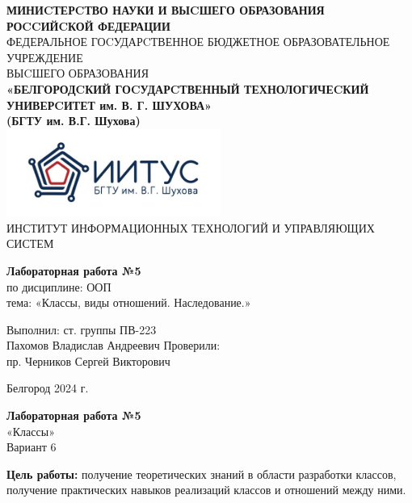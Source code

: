 \documentclass[a4paper,14pt]{extarticle}
\newcommand\textbox[1]{
	\parbox{.45\textwidth}{#1}
}
\begin{document}
\begin{center}
    \small{
        \textbf{МИНИCТЕРCТВО НАУКИ И ВЫCШЕГО ОБРАЗОВАНИЯ РОCCИЙCКОЙ ФЕДЕРАЦИИ}\\
        ФЕДЕРАЛЬНОЕ ГОCУДАРCТВЕННОЕ БЮДЖЕТНОЕ ОБРАЗОВАТЕЛЬНОЕ УЧРЕЖДЕНИЕ\\ВЫCШЕГО ОБРАЗОВАНИЯ \\
        \textbf{«БЕЛГОРОДCКИЙ ГОCУДАРCТВЕННЫЙ ТЕХНОЛОГИЧЕCКИЙ\\УНИВЕРCИТЕТ им. В. Г. ШУХОВА»\\ (БГТУ им. В.Г. Шухова)} \\
        \bigbreak
        \includegraphics[width=70mm]{log}\\
        ИНСТИТУТ ИНФОРМАЦИОННЫХ ТЕХНОЛОГИЙ И УПРАВЛЯЮЩИХ СИСТЕМ\\}
\end{center}

\vfill
\begin{center}
    \large{
        \textbf{
            Лабораторная работа №5}}\\
    \normalsize{
        по дисциплине: ООП \\
        тема: «Классы, виды отношений. Наследование.»}
\end{center}
\vfill
\hfill\textbox{
    Выполнил: ст. группы ПВ-223\\Пахомов Владислав Андреевич
    \bigbreak
    Проверили: \\пр. Черников Сергей Викторович
}
\vfill\begin{center}
    Белгород 2024 г.
\end{center}
\newpage
\begin{center}
    \textbf{Лабораторная работа №5}\\
    «Классы»\\
    Вариант 6
\end{center}
\textbf{Цель работы: }получение теоретических знаний в области
разработки классов, получение практических навыков реализаций классов
и отношений между ними.
\end{document}
